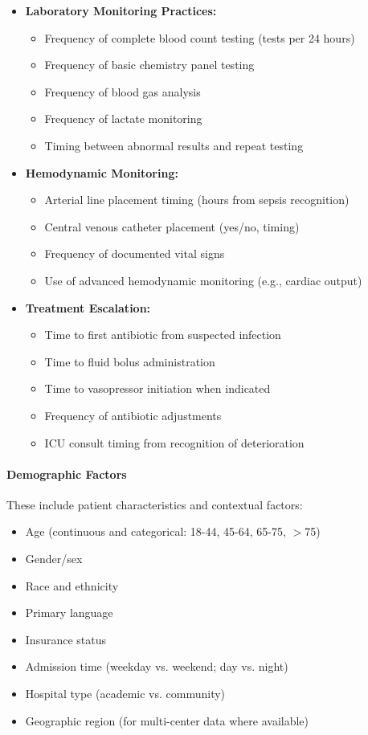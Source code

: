 \documentclass[12pt]{article}
\begin{document}
\begin{itemize}
    \item \textbf{Laboratory Monitoring Practices:}
    \begin{itemize}
        \item Frequency of complete blood count testing (tests per 24 hours)
        \item Frequency of basic chemistry panel testing
        \item Frequency of blood gas analysis
        \item Frequency of lactate monitoring
        \item Timing between abnormal results and repeat testing
    \end{itemize}
    \item \textbf{Hemodynamic Monitoring:}
    \begin{itemize}
        \item Arterial line placement timing (hours from sepsis recognition)
        \item Central venous catheter placement (yes/no, timing)
        \item Frequency of documented vital signs
        \item Use of advanced hemodynamic monitoring (e.g., cardiac output)
    \end{itemize}
    \item \textbf{Treatment Escalation:}
    \begin{itemize}
        \item Time to first antibiotic from suspected infection
        \item Time to fluid bolus administration
        \item Time to vasopressor initiation when indicated
        \item Frequency of antibiotic adjustments
        \item ICU consult timing from recognition of deterioration
    \end{itemize}
\end{itemize}

\paragraph{Demographic Factors} These include patient characteristics and contextual factors:

\begin{itemize}
    \item Age (continuous and categorical: 18-44, 45-64, 65-75, $>$75)
    \item Gender/sex
    \item Race and ethnicity
    \item Primary language
    \item Insurance status
    \item Admission time (weekday vs. weekend; day vs. night)
    \item Hospital type (academic vs. community)
    \item Geographic region (for multi-center data where available)
\end{itemize}
\end{document}

